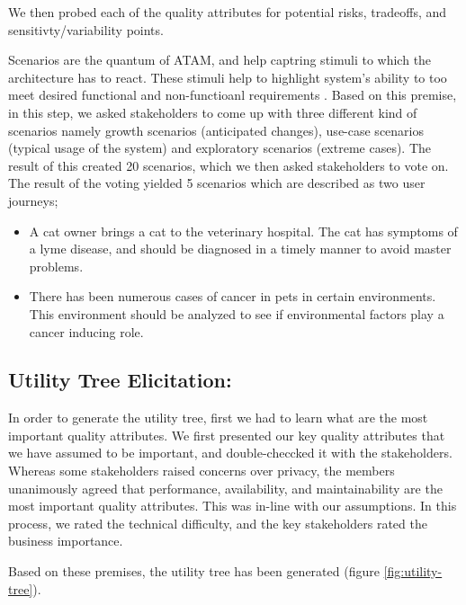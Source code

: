\documentclass[review]{elsarticle}
\begin{document}
We then probed each of the quality attributes for potential risks, tradeoffs, and sensitivty/variability points.


Scenarios are the quantum of ATAM, and help captring stimuli to which the architecture has to react. These stimuli help to highlight system's ability to too meet desired functional and non-functioanl requirements \cite{KazmanATAM}. Based on this premise, in this step, we asked stakeholders to come up with three different kind of scenarios namely growth scenarios (anticipated changes), use-case scenarios (typical usage of the system) and exploratory scenarios (extreme cases). The result of this created 20 scenarios, which we then asked stakeholders to vote on. The result of the voting yielded 5 scenarios which are described as two user journeys;

\begin{itemize}
    \item A cat owner brings a cat to the veterinary hospital. The cat has symptoms of a lyme disease, and should be diagnosed in a timely manner to avoid master problems.
    \item There has been numerous cases of cancer in pets in certain environments. This environment should be analyzed to see if environmental factors play a cancer inducing role.
\end{itemize}

\subsection{Utility Tree Elicitation:}
In order to generate the utility tree, first we had to learn what are the most important quality attributes. We first presented our key quality attributes that we have assumed to be important, and double-checcked it with the stakeholders. Whereas some stakeholders raised concerns over privacy, the members unanimously agreed that performance, availability, and maintainability are the most important quality attributes. This was in-line with our assumptions. In this process, we rated the technical difficulty, and the key stakeholders rated the business importance.

Based on these premises, the utility tree has been generated (figure \ref{fig:utility-tree}).
\end{document}
